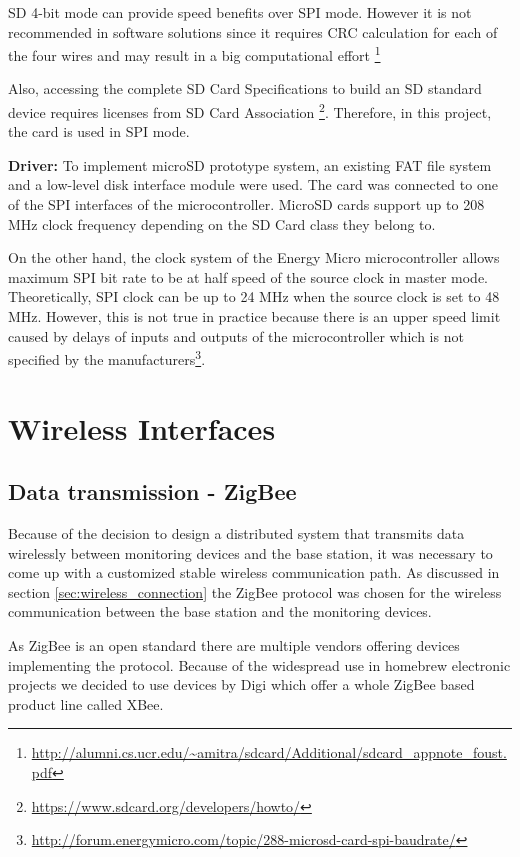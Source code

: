 SD 4-bit mode can provide speed benefits over SPI mode. However it is not recommended in software solutions since it requires CRC calculation for each of the four wires and may result in a big computational effort \footnote{\url{http://alumni.cs.ucr.edu/~amitra/sdcard/Additional/sdcard_appnote_foust.pdf}}

Also, accessing the complete SD Card Specifications to build an SD standard device requires licenses from SD Card Association \footnote{\url{https://www.sdcard.org/developers/howto/}}. Therefore, in this project, the card is used in SPI mode. 

\textbf{Driver:}
To implement microSD prototype system, an existing FAT file system and a low-level disk interface module were used. The card was connected to one of the SPI interfaces of the microcontroller. MicroSD cards support up to 208 MHz clock frequency depending on the SD Card class they belong to. 

On the other hand, the clock system of the Energy Micro microcontroller allows maximum SPI bit rate to be at half speed of the source clock in master mode. Theoretically, SPI clock can be up to 24 MHz when the source clock is set to 48 MHz. However, this is not true in practice because there is an upper speed limit caused by delays of inputs and outputs of the microcontroller which is not specified by the manufacturers\footnote{\url{http://forum.energymicro.com/topic/288-microsd-card-spi-baudrate/}}. 

\section{Wireless Interfaces}
\subsection{Data transmission - ZigBee}
Because of the decision to design a distributed system that transmits data wirelessly between monitoring devices and the base station, it was necessary to come up with a customized stable wireless communication path. As discussed in section \ref{sec:wireless_connection} the ZigBee protocol was chosen for the wireless communication between the base station and the monitoring devices.

As ZigBee is an open standard there are multiple vendors offering devices implementing the protocol. Because of the widespread use in homebrew electronic projects we decided to use devices by Digi which offer a whole ZigBee based product line called XBee. 

